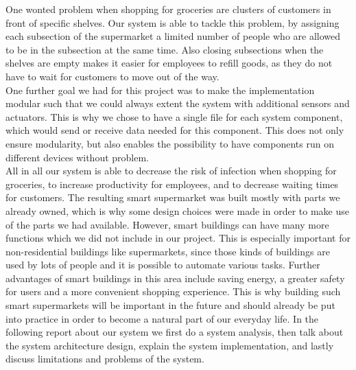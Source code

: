 \documentclass[runningheads]{llncs}
\begin{document}
	One wonted problem when shopping for groceries are clusters of customers in front of specific shelves. 
	Our system is able to tackle this problem, by assigning each subsection of the supermarket a limited number of people who are allowed to be in the subsection at the same time. 
	Also closing subsections when the shelves are empty makes it easier for employees to refill goods, as they do not have to wait for customers to move out of the way.
	\\ \linebreak
	One further goal we had for this project was to make the implementation modular such that we could always extent the system with additional sensors and actuators. 
	This is why we chose to have a single file for each system component, which would send or receive data needed for this component. 
	This does not only ensure modularity, but also enables the possibility to have components run on different devices without problem.
	\\ \linebreak
	All in all our system is able to decrease the risk of infection when shopping for groceries, to increase productivity for employees, and to decrease waiting times for customers.
	The resulting smart supermarket was built mostly with parts we already owned, which is why some design choices were made in order to make use of the parts we had available.
	However, smart buildings can have many more functions which we did not include in our project. 
	This is especially important for non-residential buildings like supermarkets, since those kinds of buildings are used by lots of people and it is possible to automate various tasks.
	Further advantages of smart buildings in this area include saving energy, a greater safety for users and a more convenient shopping experience. 
	This is why building such smart supermarkets will be important in the future and should already be put into practice in order to become a natural part of our everyday life. 
	In the following report about our system we first do a system analysis, then talk about the system architecture design, explain the system implementation, and lastly discuss limitations and problems of the system. 
	
\end{document}
